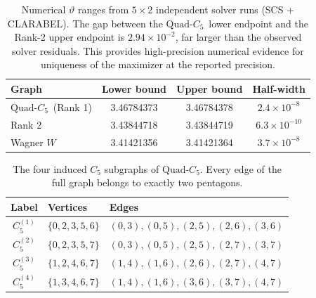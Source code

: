 \documentclass[aps,pra,twocolumn,superscriptaddress,longbibliography,floatfix]{revtex4-2}
\newcommand{\vt}{\vartheta}
\newcommand{\QC}{\ensuremath{\text{Quad-}C_5}}
\begin{document}
\begin{table}[!ht]
  \caption{Numerical $\vt$ ranges from $5\times2$ independent solver
           runs (SCS + CLARABEL). The gap between the \QC\ lower endpoint
           and the Rank-2 upper endpoint is $2.94\times10^{-2}$, far
           larger than the observed solver residuals.
           This provides high-precision numerical evidence for uniqueness
           of the maximizer at the reported precision.}
  \label{tab:intervals}
  \begin{ruledtabular}
  \scriptsize
  \begin{tabular}{lccc}
    Graph & Lower bound & Upper bound & Half-width \\
    \hline
    \QC\ (Rank 1) & 3.46784373 & 3.46784378 & $2.4\times10^{-8}$ \\
    Rank 2        & 3.43844718 & 3.43844719 & $6.3\times10^{-10}$ \\
    Wagner $W$    & 3.41421356 & 3.41421364 & $3.7\times10^{-8}$ \\
  \end{tabular}
  \end{ruledtabular}
\end{table}
\begin{table}[!ht]
  \caption{The four induced $C_5$ subgraphs of \QC.
           Every edge of the full graph belongs to exactly two pentagons.}
  \label{tab:c5_subgraphs}
  \begin{ruledtabular}
  \scriptsize
  \begin{tabular}{cll}
    Label & Vertices & Edges \\
    \hline
    $C_5^{(1)}$ & $\{0,2,3,5,6\}$ & $(0,3),(0,5),(2,5),(2,6),(3,6)$ \\
    $C_5^{(2)}$ & $\{0,2,3,5,7\}$ & $(0,3),(0,5),(2,5),(2,7),(3,7)$ \\
    $C_5^{(3)}$ & $\{1,2,4,6,7\}$ & $(1,4),(1,6),(2,6),(2,7),(4,7)$ \\
    $C_5^{(4)}$ & $\{1,3,4,6,7\}$ & $(1,4),(1,6),(3,6),(3,7),(4,7)$ \\
  \end{tabular}
  \end{ruledtabular}
\end{table}
\end{document}
